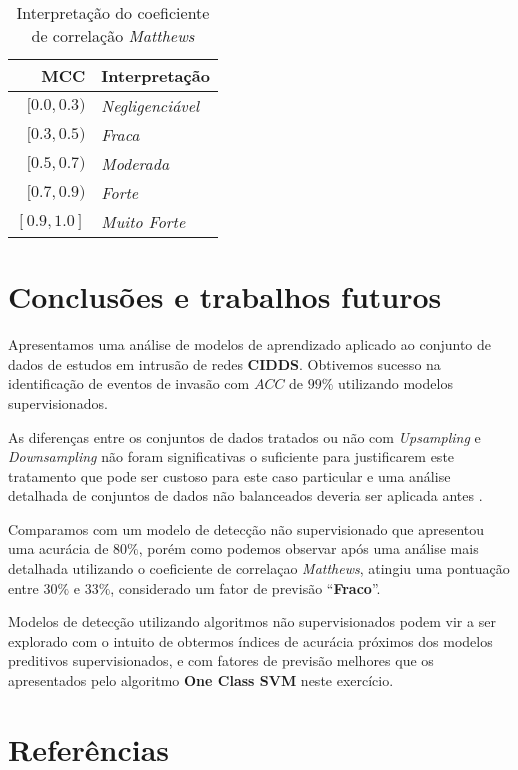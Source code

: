 \documentclass[twoside]{article}
\begin{document}
\begin{table}\scriptsize
    \centering
    \begin{tabular}{rl}
        \toprule
            MCC &  Interpretação \\
        \midrule
        $[0.0, 0.3)$ & \textit{Negligenciável} \\
        $[0.3, 0.5)$ & \textit{Fraca} \\
        $[0.5, 0.7)$ & \textit{Moderada} \\
        $[0.7, 0.9)$ & \textit{Forte} \\
        $[0.9, 1.0]$ & \textit{Muito Forte} \\
        \bottomrule
        \end{tabular}
    \caption{Interpretação do coeficiente de correlação \textit{Matthews}}
    \label{tab:mcc}
\normalsize\end{table}

\section{Conclusões e trabalhos futuros}

Apresentamos uma análise de modelos de aprendizado aplicado ao conjunto de dados de estudos em intrusão de redes \textbf{CIDDS}. Obtivemos sucesso na identificação de eventos de invasão com $ACC$ de $99\%$ utilizando modelos supervisionados. 

As diferenças entre os conjuntos de dados tratados ou não com \textit{Upsampling} e \textit{Downsampling} não foram significativas o suficiente para justificarem este tratamento que pode ser custoso para este caso particular e uma análise detalhada de conjuntos de dados não balanceados deveria ser aplicada antes \cite{barella2021assessing}.

Comparamos com um modelo de detecção não supervisionado que apresentou uma acurácia de $80\%$, porém como podemos observar após uma análise mais detalhada utilizando o coeficiente de correlaçao \textit{Matthews}, atingiu uma pontuação entre $30\%$ e $33\%$, considerado um fator de previsão ``\textbf{Fraco}''. 

Modelos de detecção utilizando algoritmos não supervisionados podem vir a ser explorado com o intuito de obtermos índices de acurácia próximos dos modelos preditivos supervisionados, e com fatores de previsão melhores que os apresentados pelo algoritmo \textbf{One Class SVM} neste exercício.

\footnotesize{
    \printnoidxglossary[type=acronym]
    \printnoidxglossary[type=main]
}\normalsize

\section{Referências}

    
    \begingroup
        \renewcommand{\section}[2]{}
        \footnotesize{
            
        }\normalsize
    \endgroup
\end{document}
